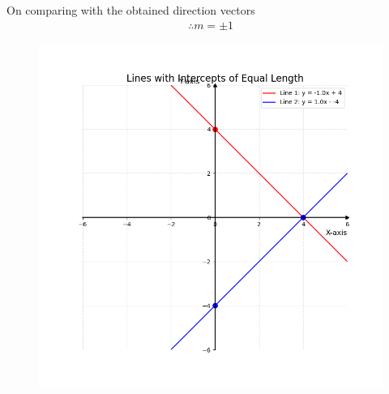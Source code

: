 \documentclass[journal]{IEEEtran}
\begin{document}
			On comparing with the obtained direction vectors
	\begin{align}
		\therefore m = \pm1
	\end{align}

	
	\begin{figure}[H]
		\centering
		\includegraphics[width = 0.8\columnwidth]{Figure_1.png}
		\caption*{}
		\label{fig1}
	\end{figure}
	
\end{document}
